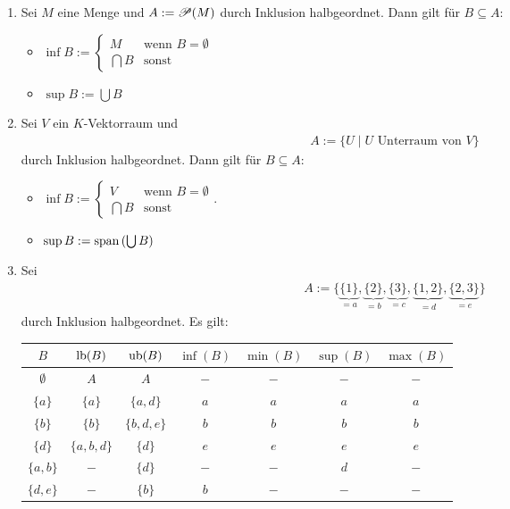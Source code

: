 \documentclass[../../main.tex]{subfiles}
\begin{document}
\begin{bsp}\label{12.1.8}
\begin{enumerate}[\normalfont(a)]
\item Sei $M$ eine Menge und $A:=\mathcal P(M)$ durch Inklusion halbgeordnet. Dann gilt für $B\subseteq A$:
\begin{itemize}
\item $\inf B:=\begin{cases} M & \text{wenn } B=\emptyset\\ \bigcap B & \text{sonst}\end{cases}$
\item $\sup B:=\bigcup B$
\end{itemize}
\item Sei $V$ ein $K$-Vektorraum und
\begin{align*}
A:=\{U\mid U \text{ Unterraum von } V\}
\end{align*}
durch Inklusion halbgeordnet. Dann gilt für $B\subseteq A$:
\begin{itemize}
\item $\inf B:=\begin{cases} V & \text{wenn }B=\emptyset\\ \bigcap B & \text{sonst}\end{cases}$.
\item $\sup B:=\operatorname{span}\left(\bigcup B\right)$
\end{itemize}
\item Sei
\begin{align*}
A:=\{\underbrace{\{1\}}_{=a},\underbrace{\{2\}}_{=b},\underbrace{\{3\}}_{=c},\underbrace{\{1,2\}}_{=d},\underbrace{\{2,3\}}_{=e}\}
\end{align*}
durch Inklusion halbgeordnet. Es gilt:
\begin{table}[H]
\centering
\begin{tabular}{c|c|c|c|c|c|c}
$B$ & $\operatorname{lb}(B)$ & $\operatorname{ub}(B)$ & $\inf(B)$ & $\min(B)$ & $\sup(B)$ & $\max(B)$\\
\hline
$\emptyset$ & $A$ & $A$ & $-$ & $-$ & $-$ & $-$\\
$\{a\}$ & $\{a\}$ & $\{a,d\}$ & $a$ & $a$ & $a$ & $a$\\
$\{b\}$ & $\{b\}$ & $\{b,d,e\}$ & $b$ & $b$ & $b$ & $b$\\
$\{d\}$ & $\{a,b,d\}$ & $\{d\}$ & $e$ & $e$ & $e$ & $e$\\
$\{a,b\}$ & $-$ & $\{d\}$ & $-$ & $-$ & $d$ & $-$\\
$\{d,e\}$ & $-$ & $\{b\}$ & $b$ & $-$ & $-$ & $-$
\end{tabular}

\end{table}
\end{enumerate}
\end{bsp}
\end{document}
